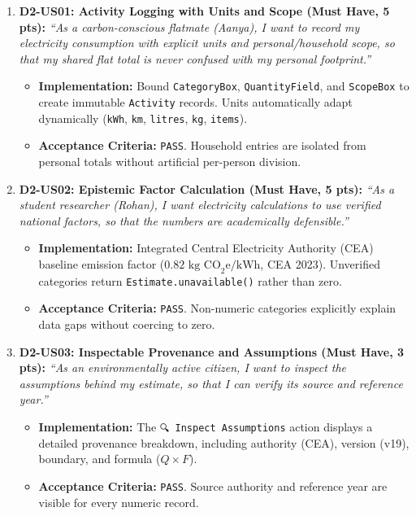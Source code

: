 \documentclass[12pt,a4paper]{article}
\newcommand{\code}[1]{\texttt{#1}}
\begin{document}
\begin{enumerate}[leftmargin=*]
  \item \textbf{D2-US01: Activity Logging with Units and Scope (Must Have, 5 pts):}
    \textit{``As a carbon-conscious flatmate (Aanya), I want to record my electricity consumption with explicit units and personal/household scope, so that my shared flat total is never confused with my personal footprint.''}
    \begin{itemize}[nosep]
      \item \textbf{Implementation:} Bound \code{CategoryBox}, \code{QuantityField}, and \code{ScopeBox} to create immutable \code{Activity} records. Units automatically adapt dynamically (\code{kWh}, \code{km}, \code{litres}, \code{kg}, \code{items}).
      \item \textbf{Acceptance Criteria:} \code{PASS}. Household entries are isolated from personal totals without artificial per-person division.
    \end{itemize}

  \item \textbf{D2-US02: Epistemic Factor Calculation (Must Have, 5 pts):}
    \textit{``As a student researcher (Rohan), I want electricity calculations to use verified national factors, so that the numbers are academically defensible.''}
    \begin{itemize}[nosep]
      \item \textbf{Implementation:} Integrated Central Electricity Authority (CEA) baseline emission factor ($0.82\text{ kg CO}_2\text{e/kWh}$, CEA 2023). Unverified categories return \code{Estimate.unavailable()} rather than zero.
      \item \textbf{Acceptance Criteria:} \code{PASS}. Non-numeric categories explicitly explain data gaps without coercing to zero.
    \end{itemize}

  \item \textbf{D2-US03: Inspectable Provenance and Assumptions (Must Have, 3 pts):}
    \textit{``As an environmentally active citizen, I want to inspect the assumptions behind my estimate, so that I can verify its source and reference year.''}
    \begin{itemize}[nosep]
      \item \textbf{Implementation:} The \code{🔍 Inspect Assumptions} action displays a detailed provenance breakdown, including authority (CEA), version (v19), boundary, and formula ($Q \times F$).
      \item \textbf{Acceptance Criteria:} \code{PASS}. Source authority and reference year are visible for every numeric record.
    \end{itemize}


\end{enumerate}
\end{document}
